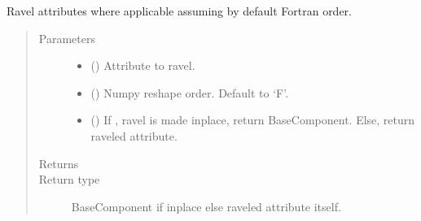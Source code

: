 \documentclass[letterpaper,10pt,english]{sphinxmanual}
\begin{document}
\begin{fulllineitems}
\begin{fulllineitems}
\end{fulllineitems}


\begin{fulllineitems}
\label{\detokenize{api/wells:geology.src.wells.Wells.ravel}}
Ravel attributes where applicable assuming by default Fortran order.
\begin{quote}\begin{description}
\item[{Parameters}] \leavevmode\begin{itemize}
\item {} 
 (\sphinxstyleliteralemphasis{\sphinxupquote{, }}) \textendash{} Attribute to ravel.

\item {} 
 () \textendash{} Numpy reshape order. Default to ‘F’.

\item {} 
 () \textendash{} If , ravel is made inplace, return BaseComponent.
Else, return raveled attribute.

\end{itemize}

\item[{Returns}] \leavevmode
{}

\item[{Return type}] \leavevmode
BaseComponent if inplace else raveled attribute itself.

\end{description}\end{quote}

\end{fulllineitems}



\end{fulllineitems}
\end{document}
